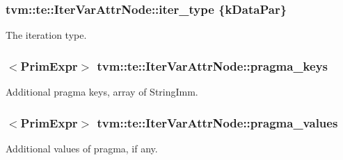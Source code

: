 \subsubsection[{\texorpdfstring{iter\+\_\+type}{iter_type}}]{ tvm\+::te\+::\+Iter\+Var\+Attr\+Node\+::iter\+\_\+type \{k\+Data\+Par\}}\hypertarget{classtvm_1_1te_1_1IterVarAttrNode_a117f5272600ac61f86dd110961e384bc}{}\label{classtvm_1_1te_1_1IterVarAttrNode_a117f5272600ac61f86dd110961e384bc}


The iteration type. 

\subsubsection[{\texorpdfstring{pragma\+\_\+keys}{pragma_keys}}]{$<${\bf Prim\+Expr}$>$ tvm\+::te\+::\+Iter\+Var\+Attr\+Node\+::pragma\+\_\+keys}\hypertarget{classtvm_1_1te_1_1IterVarAttrNode_a0bcbe78c8ad2fec77112b3156bfe0d81}{}\label{classtvm_1_1te_1_1IterVarAttrNode_a0bcbe78c8ad2fec77112b3156bfe0d81}


Additional pragma keys, array of String\+Imm. 

\subsubsection[{\texorpdfstring{pragma\+\_\+values}{pragma_values}}]{$<${\bf Prim\+Expr}$>$ tvm\+::te\+::\+Iter\+Var\+Attr\+Node\+::pragma\+\_\+values}\hypertarget{classtvm_1_1te_1_1IterVarAttrNode_aea7a6bc44a7ddca46c76c666eba37b7f}{}\label{classtvm_1_1te_1_1IterVarAttrNode_aea7a6bc44a7ddca46c76c666eba37b7f}


Additional values of pragma, if any. 

